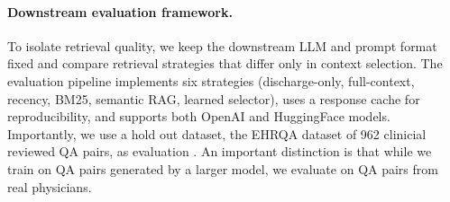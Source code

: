 \paragraph{Downstream evaluation framework.}
To isolate retrieval quality, we keep the downstream LLM and prompt format fixed and compare retrieval strategies that differ only in context selection. The evaluation pipeline implements six strategies (discharge-only, full-context, recency, BM25, semantic RAG, learned selector), uses a response cache for reproducibility, and supports both OpenAI and HuggingFace models. Importantly, we use a hold out dataset, the EHRQA dataset of 962 clinicial reviewed QA pairs, as evaluation \cite{PhysioNet-ehr-notes-qa-llms-1.0.1}. An important distinction is that while we train on QA pairs generated by a larger model, we evaluate on QA pairs from real physicians.